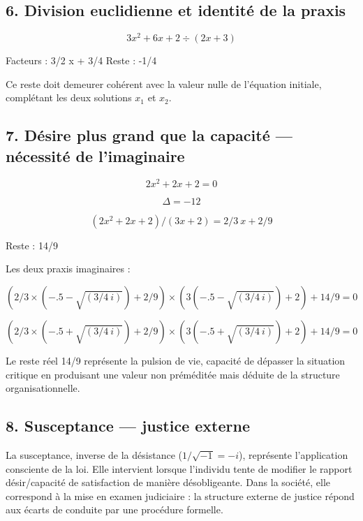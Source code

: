\documentclass[12pt,letterpaper,oneside]{article}
\begin{document}
\subsection*{6. Division euclidienne et identité de la praxis}
\[3x^2 + 6x + 2 \div (2x + 3)\]

Facteurs : 3/2 x + 3/4 Reste : -1/4

Ce reste doit demeurer cohérent avec la valeur nulle de l’équation initiale, complétant les deux solutions $x_1$ et $x_2$.

\subsection*{7. Désire plus grand que la capacité — nécessité de l’imaginaire}
\[2x^2 + 2x + 2 = 0\]

\[\Delta = -12\]

\[(2x^2 + 2x + 2) / (3x + 2) = 2/3\ x + 2/9\]

Reste : 14/9

Les deux praxis imaginaires :

\[(2/3\times(-.5-\sqrt{(3/4\ i)})+2/9)\times(3(-.5-\sqrt{(3/4\ i)})+2)+14/9=0\]

\[(2/3\times(-.5+\sqrt{(3/4\ i)})+2/9)\times(3(-.5+\sqrt{(3/4\ i)})+2)+14/9=0\]

Le reste réel 14/9 représente la pulsion de vie, capacité de dépasser la situation critique en produisant une valeur non préméditée mais déduite de la structure organisationnelle.

\subsection*{8. Susceptance — justice externe}
La susceptance, inverse de la désistance ($1/\sqrt{-1} = -i$), représente l’application consciente de la loi. Elle intervient lorsque l’individu tente de modifier le rapport désir/capacité de satisfaction de manière désobligeante. Dans la société, elle correspond à la mise en examen judiciaire : la structure externe de justice répond aux écarts de conduite par une procédure formelle.
\end{document}
